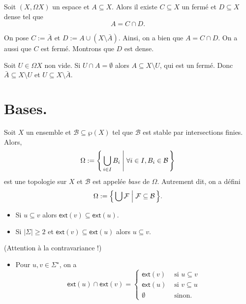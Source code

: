 \documentclass[./main]{subfiles}
\begin{document}
  \begin{thm}[Décomposition]
    Soit $(X, \Omega X)$ un espace et $A \subseteq X$.
    Alors il existe $C \subseteq X$ un fermé et $D \subseteq X$ dense tel que 
    \[
    A = C \cap D
    .\] 
  \end{thm}
  \begin{prv}
    On pose $C := \bar{A}$ et $D := A \cup (X \setminus \bar{A})$.
    Ainsi, on a bien que $A = C \cap D$.
    On a aussi que $C$ est fermé.
    Montrons que $D$ est dense.

    Soit $U \in \Omega X$ non vide.
    Si $U \cap A = \emptyset$ alors $A \subseteq X \setminus U$, qui est un fermé.
    Donc $\bar{A} \subseteq X \setminus U$ et $U \subseteq X \setminus \bar{A}$.
  \end{prv}

  \section{Bases.}

  \begin{defn}
    Soit $X$ un ensemble et $\mathcal{B} \subseteq \wp(X)$ tel que $\mathcal{B}$ est stable par intersections finies.
    Alors, 
    \[
      \Omega := \mleft\{\,\bigcup_{i \in I} B_i \;\middle|\; \forall i \in I, B_i \in \mathcal{B}\,\mright\} 
    \]
    est une topologie sur $X$ et $\mathcal{B}$ est appelée \textit{base} de $\Omega$.
    Autrement dit, on a défini
    \[
    \Omega := \mleft\{\,\bigcup \mathcal{F}  \;\middle|\; \mathcal{F} \subseteq \mathcal{B}\,\mright\} 
    .\] 
  \end{defn}

  \begin{lem}
    \begin{itemize}
      \item Si $u \subseteq v$ alors $\mathsf{ext}(v) \subseteq \mathsf{ext}(u)$.
      \item Si $|\Sigma| \ge 2$ et $\mathsf{ext}(v) \subseteq \mathsf{ext}(u)$ alors $u \subseteq v$.
    \end{itemize}
    (Attention à la contravariance !)

    \begin{itemize}
      \item Pour $u, v \in \Sigma^\star$, 
        on a 
        \[
        \mathsf{ext}(u) \cap \mathsf{ext}(v) = \begin{cases}
          \mathsf{ext}(v) & \text{ si } u \subseteq v\\
          \mathsf{ext}(u) & \text{ si } v \subseteq u\\
          \emptyset & \text{ sinon}.
        \end{cases}
        \] 
    \end{itemize}
  \end{lem}
\end{document}

